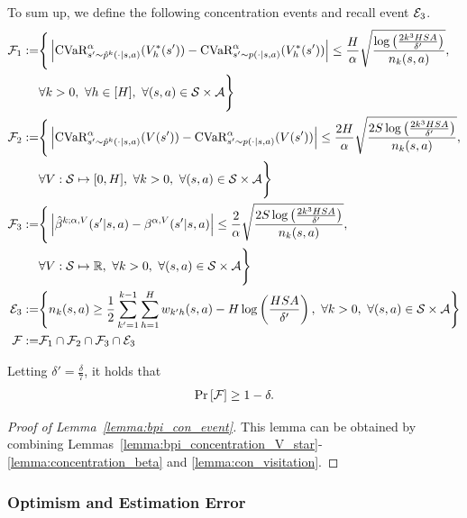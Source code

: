 To sum up, we define the following concentration events and recall event $\mathcal{E}_3$.
\begin{align*}
	\mathcal{F}_1:= & \Bigg\{ \left| \textup{CVaR}^{\alpha}_{s' \sim \hat{p}^k(\cdot|s,a)}(V^{*}_h(s')) - \textup{CVaR}^{\alpha}_{s' \sim p(\cdot|s,a)}(V^{*}_h(s')) \right| \leq \frac{H}{\alpha}\sqrt{\frac{ \log \left( \frac{2k^3HSA}{\delta'} \right) }{n_k(s,a)}} ,
	\\ & \forall k>0,\ \forall h \in [H],\ \forall (s,a) \in \mathcal{S} \times \mathcal{A} \Bigg\} 
	\\
	\mathcal{F}_2:= & \Bigg\{ \left| \textup{CVaR}^{\alpha}_{s' \sim \hat{p}^k(\cdot|s,a)}(V(s')) - \textup{CVaR}^{\alpha}_{s' \sim p(\cdot|s,a)}(V(s')) \right| \leq \frac{2H}{\alpha}\sqrt{\frac{2S\log \left( \frac{2k^3HSA}{\delta'} \right)}{n_k(s,a)}} ,
	\\ & \forall V: \mathcal{S} \mapsto [0,H],\ \forall k>0,\ \forall (s,a) \in \mathcal{S} \times \mathcal{A} \Bigg\} 
	\\
	\mathcal{F}_3:= & \Bigg\{ \left|  \hat{\beta}^{k;\alpha,V}(s'|s,a) - \beta^{\alpha,V}(s'|s,a)  \right| \leq \frac{2}{\alpha}\sqrt{\frac{2S\log \left( \frac{2k^3HSA}{\delta'} \right)}{n_k(s,a)}} ,
	\\ & \forall V: \mathcal{S} \mapsto \mathbb{R},\ \forall k>0,\ \forall (s,a) \in \mathcal{S} \times \mathcal{A} \Bigg\} 
	\\
	\mathcal{E}_3:= & \Bigg\{ n_k(s,a) \geq \frac{1}{2} \sum_{k'=1}^{k-1} \sum_{h=1}^{H} w_{k'h}(s,a) - H \log \left( \frac{HSA}{\delta'} \right) ,
	\ \forall k>0,\ \forall (s,a) \in \mathcal{S} \times \mathcal{A}
	\Bigg\} 
	\\
	\mathcal{F}:= & \mathcal{F}_1 \cap \mathcal{F}_2 \cap \mathcal{F}_3 \cap \mathcal{E}_3 
\end{align*}


\begin{lemma}\label{lemma:bpi_con_event}
	Letting $\delta'=\frac{\delta}{7}$, it holds that
	\begin{align*}
		\Pr \left[ \mathcal{F} \right] \geq 1-\delta .
	\end{align*}
\end{lemma}
\begin{proof}[Proof of Lemma~\ref{lemma:bpi_con_event}]
	This lemma can be obtained by combining Lemmas~\ref{lemma:bpi_concentration_V_star}-\ref{lemma:concentration_beta} and \ref{lemma:con_visitation}.
\end{proof}



\subsubsection{Optimism and Estimation Error}

